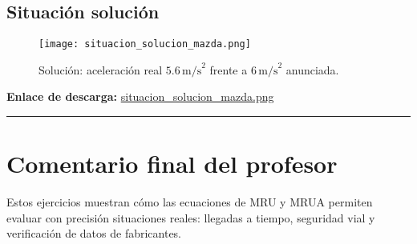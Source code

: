 \documentclass[14pt,letterpaper]{extarticle} %
\begin{document}
\subsection{Situación solución}
\begin{figure}[h!]
  \centering
  \texttt{[image: situacion\_solucion\_mazda.png]}
  \caption{Solución: aceleración real \(5.6\,\text{m/s}^2\) frente a \(6\,\text{m/s}^2\) anunciada.}
\end{figure}
\noindent\textbf{Enlace de descarga:} \href{run:imagenes/situacion_solucion_mazda.png}{situacion\_solucion\_mazda.png}

\bigskip
\hrule
\bigskip

\section*{Comentario final del profesor}
Estos ejercicios muestran cómo las ecuaciones de MRU y MRUA permiten evaluar con precisión situaciones reales:  
llegadas a tiempo, seguridad vial y verificación de datos de fabricantes.
\end{document}
